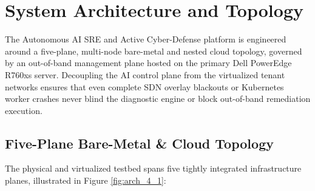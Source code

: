 \section{System Architecture and Topology}
The Autonomous AI SRE and Active Cyber-Defense platform is engineered around a five-plane, multi-node bare-metal and nested cloud topology, governed by an out-of-band management plane hosted on the primary Dell PowerEdge R760xs server. Decoupling the AI control plane from the virtualized tenant networks ensures that even complete SDN overlay blackouts or Kubernetes worker crashes never blind the diagnostic engine or block out-of-band remediation execution.

\subsection*{Five-Plane Bare-Metal \& Cloud Topology}
The physical and virtualized testbed spans five tightly integrated infrastructure planes, illustrated in Figure \ref{fig:arch_4_1}:
